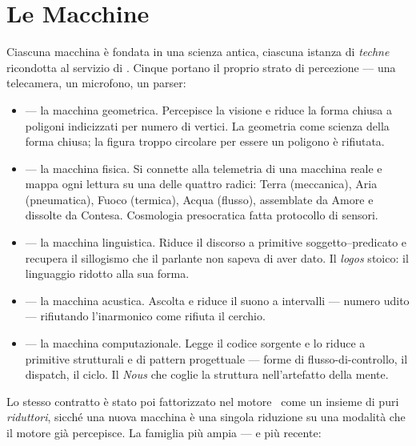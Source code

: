 \section*{Le Macchine}

Ciascuna macchina \`e fondata in una scienza antica, ciascuna istanza di
\emph{techne} ricondotta al servizio di \physis. Cinque portano il proprio strato
di percezione --- una telecamera, un microfono, un parser:

\begin{itemize}
\item {} --- la macchina geometrica. Percepisce la visione e riduce
  la forma chiusa a poligoni indicizzati per numero di vertici. La geometria come
  scienza della forma chiusa; la figura troppo circolare per essere un poligono \`e
  rifiutata.
\item {} --- la macchina fisica. Si connette alla telemetria di
  una macchina reale e mappa ogni lettura su una delle quattro radici: Terra
  (meccanica), Aria (pneumatica), Fuoco (termica), Acqua (flusso), assemblate da
  Amore e dissolte da Contesa. Cosmologia presocratica fatta protocollo di sensori.
\item {} --- la macchina linguistica. Riduce il discorso a primitive
  soggetto--predicato e recupera il sillogismo che il parlante non sapeva di aver
  dato. Il \emph{logos} stoico: il linguaggio ridotto alla sua forma.
\item {} --- la macchina acustica. Ascolta e riduce il suono a
  intervalli --- numero udito --- rifiutando l'inarmonico come 
  rifiuta il cerchio.
\item {} --- la macchina computazionale. Legge il codice sorgente e lo
  riduce a primitive strutturali e di pattern progettuale --- forme di
  flusso-di-controllo, il dispatch, il ciclo. Il \emph{Nous} che coglie la
  struttura nell'artefatto della mente.
\end{itemize}

\noindent Lo stesso contratto \`e stato poi fattorizzato nel motore \physis\ come
un insieme di puri \emph{riduttori}, sicch\'e una nuova macchina \`e una singola
riduzione su una modalit\`a che il motore gi\`a percepisce. La famiglia pi\`u
ampia --- e pi\`u recente:

